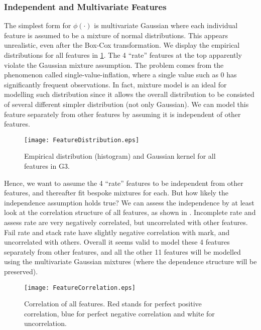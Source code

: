 \subsubsection{Independent and Multivariate Features}

The simplest form for $\phi(\cdot)$ is multivariate Gaussian where each individual feature is assumed to be a mixture of normal distributions. This appears unrealistic, even after the Box-Cox transformation. We display the empirical distributions for all features in \ref{fig:featureDistribution}. The 4 ``rate'' features at the top apparently violate the Gaussian mixture assumption. The problem comes from the phenomenon called	single-value-inflation, where a single value such as 0 has significantly frequent observations. In fact, mixture model is an ideal for modelling such distribution since it allows the overall distribution to be consisted of several different simpler distribution (not only Gaussian). We can model this feature separately from other features by assuming it is independent of other features.

\begin{figure}[!h]
\centering
\texttt{[image: FeatureDistribution.eps]}
\caption{Empirical distribution (histogram) and Gaussian kernel for all features in G3.}
\label{fig:featureDistribution}
\end{figure}

Hence, we want to assume the 4 ``rate'' features to be independent from other features, and thereafter fit bespoke mixtures for each. But how likely the independence assumption holds true? We can assess the independence by at least look at the correlation structure of all features, as shown in . Incomplete rate and assess rate are very negatively correlated, but uncorrelated with other features. Fail rate and stack rate have slightly negative correlation with mark, and uncorrelated with others. Overall it seems valid to model these 4 features separately from other features, and all the other 11 features will be modelled using the multivariate Gaussian mixtures (where the dependence structure will be preserved).

\begin{figure}[!h]
\centering
\texttt{[image: FeatureCorrelation.eps]}
\caption{Correlation of all features. Red stands for perfect positive correlation, blue for perfect negative correlation and white for uncorrelation.}
\label{fig:featureCorrelation}
\end{figure}

